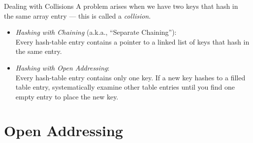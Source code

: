 \documentclass[14pt,aspectratio=1610]{beamer}
\begin{document}
\begin{frame}{Dealing with Collisions}
  A problem arises when we have two keys that hash in \\
  the same array entry --- this is called a \emph{collision}.
  
  \begin{itemize}
    \item<3->
      \emph{Hashing with Chaining} (a.k.a., ``Separate Chaining''):\\
      Every hash-table entry contains a pointer to a linked list of keys that hash in the same entry.
    \item<4->
      \emph{Hashing with Open Addressing}:\\
      Every hash-table entry contains only one key. If a new key hashes to a filled table entry, systematically examine other table entries until you find one empty entry to place the new key.
  \end{itemize}
\end{frame}

\section{Open Addressing}
\end{document}
